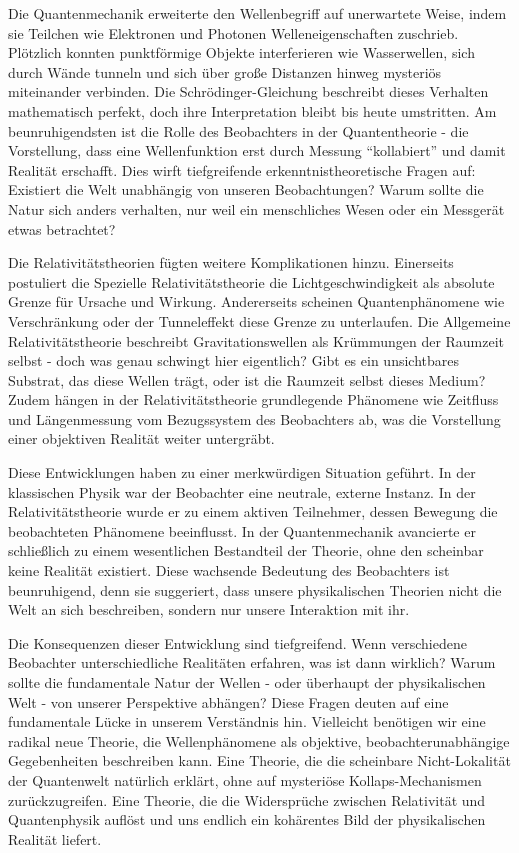 Die Quantenmechanik erweiterte den Wellenbegriff auf unerwartete Weise, indem sie Teilchen wie Elektronen und Photonen Welleneigenschaften zuschrieb. Plötzlich konnten punktförmige Objekte
interferieren wie Wasserwellen, sich durch Wände tunneln und sich über große Distanzen hinweg mysteriös miteinander verbinden. Die Schrödinger-Gleichung beschreibt dieses Verhalten mathematisch
perfekt, doch ihre Interpretation bleibt bis heute umstritten. Am beunruhigendsten ist die Rolle des Beobachters in der Quantentheorie - die Vorstellung, dass eine Wellenfunktion erst durch
Messung \enquote{kollabiert} und damit Realität erschafft. Dies wirft tiefgreifende erkenntnistheoretische Fragen auf: Existiert die Welt unabhängig von unseren Beobachtungen? Warum sollte die
Natur sich anders verhalten, nur weil ein menschliches Wesen oder ein Messgerät etwas betrachtet?

Die Relativitätstheorien fügten weitere Komplikationen hinzu. Einerseits postuliert die Spezielle Relativitätstheorie die Lichtgeschwindigkeit als absolute Grenze für Ursache und Wirkung.
Andererseits scheinen Quantenphänomene wie Verschränkung oder der Tunneleffekt diese Grenze zu unterlaufen. Die Allgemeine Relativitätstheorie beschreibt Gravitationswellen als Krümmungen
der Raumzeit selbst - doch was genau schwingt hier eigentlich? Gibt es ein unsichtbares Substrat, das diese Wellen trägt, oder ist die Raumzeit selbst dieses Medium? Zudem hängen in der
Relativitätstheorie grundlegende Phänomene wie Zeitfluss und Längenmessung vom Bezugssystem des Beobachters ab, was die Vorstellung einer objektiven Realität weiter untergräbt.

Diese Entwicklungen haben zu einer merkwürdigen Situation geführt. In der klassischen Physik war der Beobachter eine neutrale, externe Instanz. In der Relativitätstheorie wurde er zu einem
aktiven Teilnehmer, dessen Bewegung die beobachteten Phänomene beeinflusst. In der Quantenmechanik avancierte er schließlich zu einem wesentlichen Bestandteil der Theorie, ohne den scheinbar
keine Realität existiert. Diese wachsende Bedeutung des Beobachters ist beunruhigend, denn sie suggeriert, dass unsere physikalischen Theorien nicht die Welt an sich beschreiben, sondern
nur unsere Interaktion mit ihr.

Die Konsequenzen dieser Entwicklung sind tiefgreifend. Wenn verschiedene Beobachter unterschiedliche Realitäten erfahren, was ist dann wirklich? Warum sollte die fundamentale Natur
der Wellen - oder überhaupt der physikalischen Welt - von unserer Perspektive abhängen? Diese Fragen deuten auf eine fundamentale Lücke in unserem Verständnis hin. Vielleicht benötigen
wir eine radikal neue Theorie, die Wellenphänomene als objektive, beobachterunabhängige Gegebenheiten beschreiben kann. Eine Theorie, die die scheinbare Nicht-Lokalität der Quantenwelt
natürlich erklärt, ohne auf mysteriöse Kollaps-Mechanismen zurückzugreifen. Eine Theorie, die die Widersprüche zwischen Relativität und Quantenphysik auflöst und uns endlich ein kohärentes
Bild der physikalischen Realität liefert.

